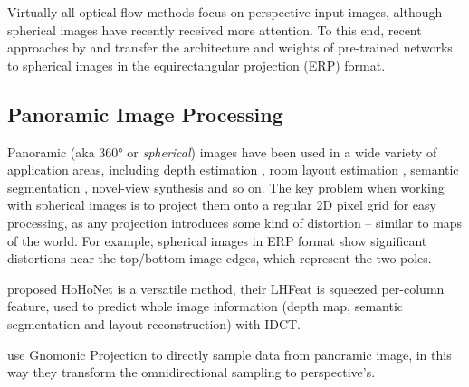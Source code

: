Virtually all optical flow methods focus on perspective input images, although spherical images have recently received more attention.
%
To this end, recent approaches by \citet{ArtizZAD2021} and \citet{BhandZY2021}
transfer the architecture and weights of pre-trained networks \cite{DosovFIHHGSCB2015,HuiTC2018} to spherical images in the equirectangular projection (ERP) format.


\subsection{Panoramic Image Processing}

Panoramic (aka 360° or \emph{spherical}) images have been used in a wide variety of application areas, including
depth estimation \cite{ImHRJCK2016, JiangSZDH2021, LaiXLL2019, SunSC2021, WangHCLYSCS2018, WangSTCS2020, WangYSCT2020, ZioulKZD2018, ZioulKZAD2019},
room layout estimation \cite{WangYSCT2021, Tran2021, EderMG2019, FernaFPDCG2020, JinXZZTXYG2020, SunSC2021, ZengKG2020},
semantic segmentation \cite{LeeJYJY2019, SunSC2021, YangZRHS2021, ZhangLSC2019},
novel-view synthesis \cite{BerteYLR2020, HuangCCJ2017, MatzeCEKS2017, XuZXTG2021} and so on.
%
The key problem when working with spherical images is to project them onto a regular 2D pixel grid for easy processing, as any projection introduces some kind of distortion – similar to maps of the world.
%
For example, spherical images in ERP format show significant distortions near the top/bottom image edges, which represent the two poles.


\citet{SunSC2021} proposed HoHoNet is a versatile method, their LHFeat is squeezed per-column feature, used to predict whole image information (depth map, semantic segmentation and layout reconstruction) with IDCT. 
\citet{WangYSCT2020}
\citet{WangHCLYSCS2018}
\citet{ChengCDWLS2018}


\cite{CoorsCG2018} use Gnomonic Projection to directly sample data from panoramic image, in this way they transform the omnidirectional sampling to perspective's.


